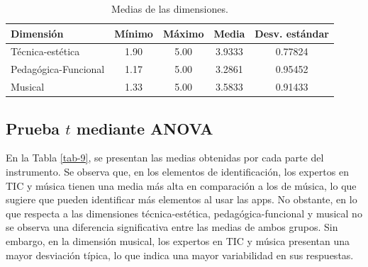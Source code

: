\documentclass[spanish]{textolivre}
\begin{document}
\begin{table}[htbp]
\centering
\begin{threeparttable}
\caption{Medias de las dimensiones.}\label{tab-8}
\begin{tabular}{lcccc}
\toprule
Dimensión & Mínimo & Máximo & Media & Desv. estándar \\
\midrule
Técnica-estética & 1.90 & 5.00 & 3.9333 & 0.77824 \\
Pedagógica-Funcional & 1.17 & 5.00 & 3.2861 & 0.95452 \\
Musical & 1.33 & 5.00 & 3.5833 & 0.91433 \\
\bottomrule
\end{tabular}
\end{threeparttable}
\end{table}

\subsection{Prueba $t$ mediante ANOVA}
En la Tabla \ref{tab-9}, se presentan las medias obtenidas por cada parte del instrumento. Se observa que, en los elementos de identificación, los expertos en TIC y música tienen una media más alta en comparación a los de música, lo que sugiere que pueden identificar más elementos al usar las apps. No obstante, en lo que respecta a las dimensiones técnica-estética, pedagógica-funcional y musical no se observa una diferencia significativa entre las medias de ambos grupos. Sin embargo, en la dimensión musical, los expertos en TIC y música presentan una mayor desviación típica, lo que indica una mayor variabilidad en sus respuestas.
\end{document}
